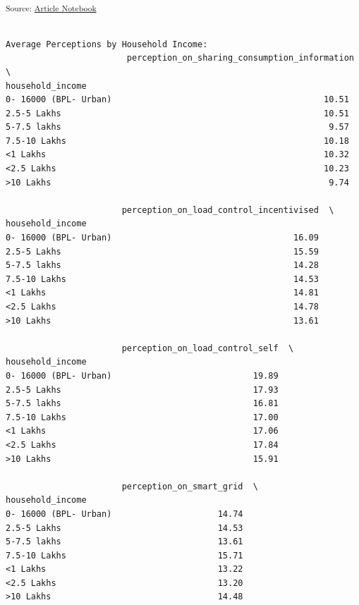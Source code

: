 \documentclass[
  letterpaper,
  DIV=11,
  numbers=noendperiod]{scrartcl}
\begin{document}
\textsubscript{Source:
\href{https://sijuswamyresearch.github.io/SM-project/index-preview.html}{Article
Notebook}}

\begin{verbatim}

Average Perceptions by Household Income:
                        perception_on_sharing_consumption_information  \
household_income                                                       
0- 16000 (BPL- Urban)                                          10.51   
2.5-5 Lakhs                                                    10.51   
5-7.5 lakhs                                                     9.57   
7.5-10 Lakhs                                                   10.18   
<1 Lakhs                                                       10.32   
<2.5 Lakhs                                                     10.23   
>10 Lakhs                                                       9.74   

                       perception_on_load_control_incentivised  \
household_income                                                 
0- 16000 (BPL- Urban)                                    16.09   
2.5-5 Lakhs                                              15.59   
5-7.5 lakhs                                              14.28   
7.5-10 Lakhs                                             14.53   
<1 Lakhs                                                 14.81   
<2.5 Lakhs                                               14.78   
>10 Lakhs                                                13.61   

                       perception_on_load_control_self  \
household_income                                         
0- 16000 (BPL- Urban)                            19.89   
2.5-5 Lakhs                                      17.93   
5-7.5 lakhs                                      16.81   
7.5-10 Lakhs                                     17.00   
<1 Lakhs                                         17.06   
<2.5 Lakhs                                       17.84   
>10 Lakhs                                        15.91   

                       perception_on_smart_grid  \
household_income                                  
0- 16000 (BPL- Urban)                     14.74   
2.5-5 Lakhs                               14.53   
5-7.5 lakhs                               13.61   
7.5-10 Lakhs                              15.71   
<1 Lakhs                                  13.22   
<2.5 Lakhs                                13.20   
>10 Lakhs                                 14.48   


\end{verbatim}
\end{document}
